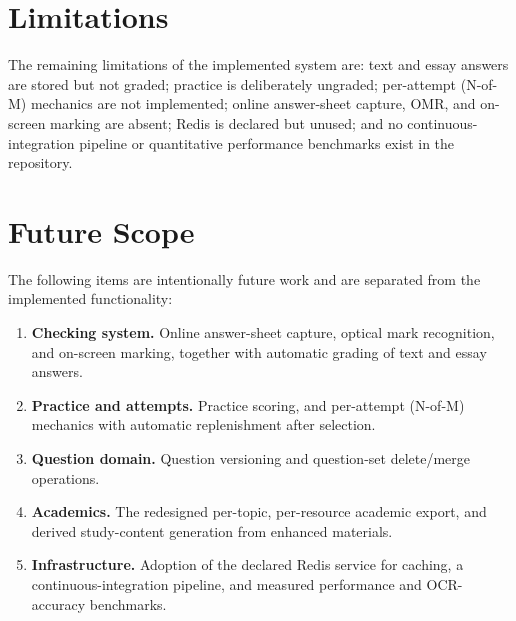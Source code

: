 \section{Limitations}

The remaining limitations of the implemented system are: text and essay
answers are stored but not graded; practice is deliberately ungraded;
per-attempt (N-of-M) mechanics are not implemented; online answer-sheet
capture, OMR, and on-screen marking are absent; Redis is declared but unused;
and no continuous-integration pipeline or quantitative performance benchmarks
exist in the repository.

\section{Future Scope}

The following items are intentionally future work and are separated from the
implemented functionality:

\begin{enumerate}
  \item \textbf{Checking system.} Online answer-sheet capture, optical mark
        recognition, and on-screen marking, together with automatic grading
        of text and essay answers.
  \item \textbf{Practice and attempts.} Practice scoring, and per-attempt
        (N-of-M) mechanics with automatic replenishment after selection.
  \item \textbf{Question domain.} Question versioning and question-set
        delete/merge operations.
  \item \textbf{Academics.} The redesigned per-topic, per-resource academic
        export, and derived study-content generation from enhanced materials.
  \item \textbf{Infrastructure.} Adoption of the declared Redis service for
        caching, a continuous-integration pipeline, and measured performance
        and OCR-accuracy benchmarks.
\end{enumerate}